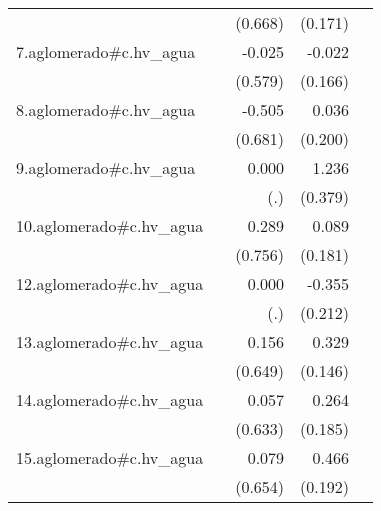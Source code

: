 {\begin{longtable}{l*{4}{D{.}{.}{-1}}}
            &                     &     (0.668)         &     (0.171)         &                     \\
\addlinespace
7.aglomerado#c.hv\_agua&                     &      -0.025         &      -0.022         &                     \\
            &                     &     (0.579)         &     (0.166)         &                     \\
\addlinespace
8.aglomerado#c.hv\_agua&                     &      -0.505         &       0.036         &                     \\
            &                     &     (0.681)         &     (0.200)         &                     \\
\addlinespace
9.aglomerado#c.hv\_agua&                     &       0.000         &       1.236\sym{**} &                     \\
            &                     &         (.)         &     (0.379)         &                     \\
\addlinespace
10.aglomerado#c.hv\_agua&                     &       0.289         &       0.089         &                     \\
            &                     &     (0.756)         &     (0.181)         &                     \\
\addlinespace
12.aglomerado#c.hv\_agua&                     &       0.000         &      -0.355         &                     \\
            &                     &         (.)         &     (0.212)         &                     \\
\addlinespace
13.aglomerado#c.hv\_agua&                     &       0.156         &       0.329\sym{*}  &                     \\
            &                     &     (0.649)         &     (0.146)         &                     \\
\addlinespace
14.aglomerado#c.hv\_agua&                     &       0.057         &       0.264         &                     \\
            &                     &     (0.633)         &     (0.185)         &                     \\
\addlinespace
15.aglomerado#c.hv\_agua&                     &       0.079         &       0.466\sym{*}  &                     \\
            &                     &     (0.654)         &     (0.192)         &                     \\

\end{longtable}}
